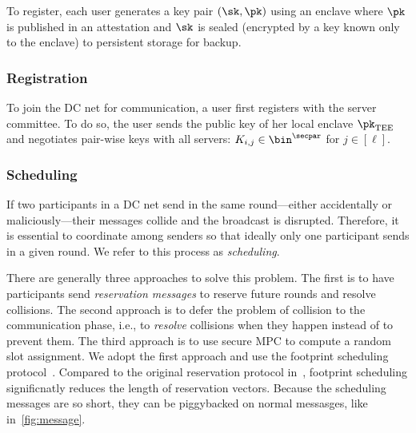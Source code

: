 To register, each user generates a key pair $(\sk, \pk)$ using an enclave where $\pk$ is published in an attestation and $\sk$ is sealed (encrypted by a key known only to the enclave) to persistent storage for backup.

\subsubsection{Registration}
To join the DC net for communication, a user first registers with the server committee. To do so, the user sends the public key of her local enclave $\enclavekey$ and negotiates pair-wise keys with all servers: $K_{i,j} \in \bin^\secpar$ for $j\in [\ell]$.


\subsubsection{Scheduling}

If two participants in a DC net send in the same round---either accidentally or maliciously---their messages collide and the broadcast is disrupted. Therefore, it is essential to coordinate among senders so that ideally only one participant sends in a given round. We refer to this process as {\em scheduling}.

There are generally three approaches to solve this problem. The first is to have participants send {\em reservation messages} to reserve future rounds and resolve collisions. The second approach is to defer the problem of collision to the communication phase, i.e., to {\em resolve} collisions when they happen instead of to prevent them. The third approach is to use secure MPC to compute a random slot assignment. We adopt the first approach and use the footprint scheduling protocol~\cite{}.  Compared to the original reservation protocol in~\cite{chaum}, footprint scheduling significnatly reduces the length of reservation vectors. Because the scheduling messages are so short, they can be piggybacked on normal messasges, like in~\cref{fig:message}.


